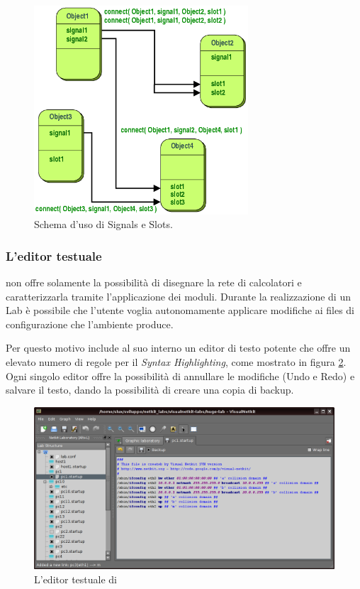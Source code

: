 \begin{figure}[!htb]
	\centering
	\includegraphics[width=8cm]{images/signals_slots.png}
	\caption{Schema d'uso di Signals e Slots.}
	\label{figura:qt_signals_slots}
\end{figure}

\subsubsection*{L'editor testuale}
\visualnetkit{} non offre solamente la possibilità di disegnare la rete di calcolatori e caratterizzarla tramite l'applicazione dei moduli. Durante la realizzazione di un Lab è possibile che l'utente voglia autonomamente applicare modifiche ai files di configurazione che l'ambiente produce.

Per questo motivo \visualnetkit{} include al suo interno un editor di testo potente che offre un elevato numero di regole per il \emph{Syntax Highlighting}, come mostrato in figura \ref{figura:vn_text}. Ogni singolo editor offre la possibilità di annullare le modifiche (Undo e Redo) e salvare il testo, dando la possibilità di creare una copia di backup.

\begin{figure}[!htb]
	\centering
	\includegraphics[width=12cm]{images/visualnetkit_editor.png}
	\caption{L'editor testuale di \visualnetkit{}}
	\label{figura:vn_text}
\end{figure}

